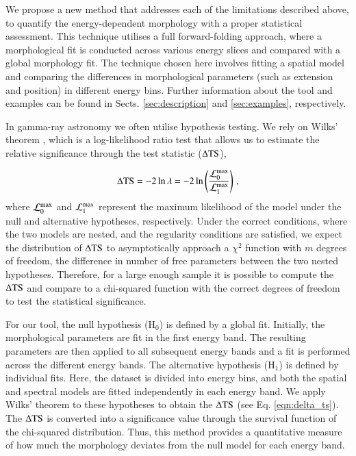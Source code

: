 \documentclass{aa}
\begin{document}
We propose a new method that addresses each of the limitations described above, to quantify the energy-dependent morphology with a proper statistical assessment. This technique utilises a full forward-folding approach, where a morphological fit is conducted across various energy slices and compared with a global morphology fit. The technique chosen here involves fitting a spatial model and comparing the differences in morphological parameters (such as extension and position) in different energy bins. 
Further information about the tool and examples can be found in Sects. \ref{sec:description} and \ref{sec:examples}, respectively.

In gamma-ray astronomy we often utilise hypothesis testing. We rely on Wilks' theorem \citep{Wilks}, which is a log-likelihood ratio test that allows us to estimate the relative significance through the test statistic ($\Delta\rm{TS}$),

\begin{equation}
\Delta\rm{TS} = -2 \ln \lambda = -2 \ln \left( \dfrac{\mathcal{L}_0^{\rm{max}}}{\mathcal{L}_1^{\rm{max}}} \right) \, ,
\label{eqn:delta_ts}
\end{equation}where $\mathcal{L}_0^{\rm{max}}$ and $\mathcal{L}_1^{\rm{max}}$ represent the maximum likelihood of the model under the null and alternative hypotheses, respectively. 
Under the correct conditions, where the two models are nested, and the regularity conditions are satisfied, we expect the distribution of $\Delta\rm{TS}$ to asymptotically approach a $\chi^2$ function with $m$ degrees of freedom, the difference in number of free parameters between the two nested hypotheses. 
Therefore, for a large enough sample it is possible to compute the $\Delta\rm{TS}$ and compare to a chi-squared function with the correct degrees of freedom to test the statistical significance. 

For our tool, the null hypothesis (H$_0$) is defined by a global fit. Initially, the morphological parameters are fit in the first energy band. The resulting parameters are then applied to all subsequent energy bands and a fit is performed across the different energy bands. The alternative hypothesis (H$_1$) is defined by individual fits. Here, the dataset is divided into energy bins, and both the spatial and spectral models are fitted independently in each energy band. We apply Wilks' theorem to these hypotheses to obtain the $\Delta\rm{TS}$ (see Eq. \ref{eqn:delta_ts}). The $\Delta\rm{TS}$ is converted into a significance value through the survival function of the chi-squared distribution. 
Thus, this method provides a quantitative measure of how much the morphology deviates from the null model for each energy band. 
\end{document}
